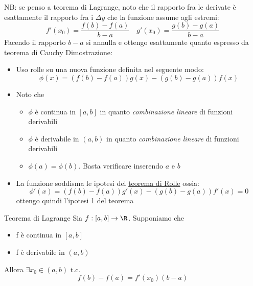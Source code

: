 NB: se penso a teorema di Lagrange, noto che il rapporto fra le derivate è esattamente il rapporto fra i $ \Delta  y$ che la funzione assume agli estremi:
\[
	f'\left( x_0 \right) = \frac{f\left( b \right) -f\left( a \right)}{b-a} \quad g'\left( x_0 \right) = \frac{g\left( b \right) - g\left( a \right) }{b-a}
\]
Facendo il rapporto $  b-a $ si annulla e ottengo esattamente quanto espresso da teorema di Cauchy
\vskip3mm
Dimostrazione:
\begin{itemize}
	\item Uso rolle su una nuova funzione definita nel seguente modo:
	      \[
		      \phi \left( x \right) = \left( f\left( b \right) -f\left( a \right)  \right) g\left( x \right) - \left( g\left( b \right) -g\left( a \right)  \right) f\left( x \right)
	      \]
	\item Noto che
	      \begin{itemize}
		      \item $\phi $ è continua in $\left[ a,b \right] $ in quanto \textit{combinazione lineare }di funzioni derivabili
		      \item $\phi $ è derivabile in $ \left( a,b \right) $ in quanto \textit{combinazione lineare }di funzioni derivabili
		      \item $\phi\left( a \right) = \phi \left( b \right)  $. Basta verificare inserendo $a$ e $b$
	      \end{itemize}
	\item La funzione soddisma le ipotesi del \underline{teorema di Rolle} ossia:
	      \[
		      \phi' \left( x \right) = \left( f\left( b \right) -f\left( a \right)  \right) g'\left( x \right) - \left( g\left( b \right) -g\left( a \right)  \right) f'\left( x \right) =0
	      \]
	      ottengo quindi l'ipotesi 1 del teorema
\end{itemize}
\begin{teorema}{Teorema di Lagrange}
	Sia $f:\left[ a,b \right] \to \R$. Supponiamo che
	\begin{itemize}
		\item f è continua in  $\left[ a,b \right] $
		\item f è derivabile in $\left( a,b \right) $
	\end{itemize}
	Allora $\exists x_0 \in  \left( a,b \right) \text{ t.c. }$
	\[
		f\left( b \right) - f\left( a \right) = f'\left( x_0 \right) \left( b-a \right)
	\]
\end{teorema}

